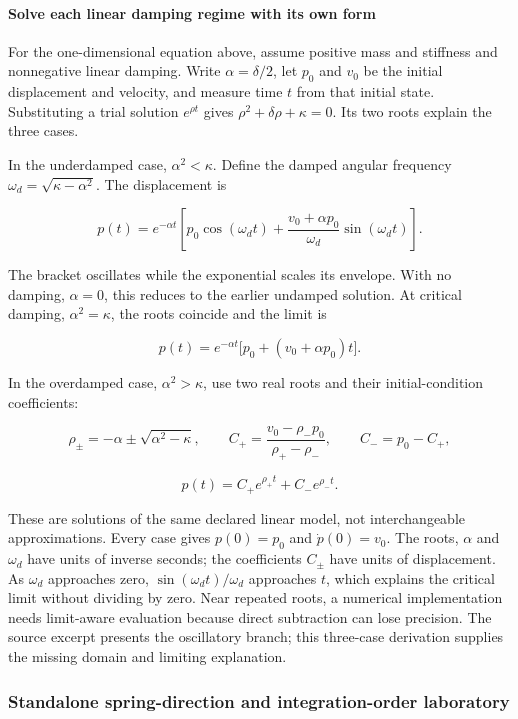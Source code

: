 \paragraph{Solve each linear damping regime with its own form}\label{solve-each-linear-damping-regime-with-its-own-form}

For the one-dimensional equation above, assume positive mass and stiffness and nonnegative linear damping. Write \(\alpha=\delta/2\), let \(p_0\) and \(v_0\) be the initial displacement and velocity, and measure time \(t\) from that initial state. Substituting a trial solution \(e^{\rho t}\) gives \(\rho^2+\delta\rho+\kappa=0\). Its two roots explain the three cases.

In the underdamped case, \(\alpha^2<\kappa\). Define the damped angular frequency \(\omega_d=\sqrt{\kappa-\alpha^2}\). The displacement is

\[
p(t)=e^{-\alpha t}\left[p_0\cos(\omega_d t)
+\frac{v_0+\alpha p_0}{\omega_d}\sin(\omega_d t)\right].
\]

The bracket oscillates while the exponential scales its envelope. With no damping, \(\alpha=0\), this reduces to the earlier undamped solution. At critical damping, \(\alpha^2=\kappa\), the roots coincide and the limit is

\[
p(t)=e^{-\alpha t}\bigl[p_0+(v_0+\alpha p_0)t\bigr].
\]

In the overdamped case, \(\alpha^2>\kappa\), use two real roots and their initial-condition coefficients:

\[
\rho_\pm=-\alpha\pm\sqrt{\alpha^2-\kappa},\qquad
C_+=\frac{v_0-\rho_-p_0}{\rho_+-\rho_-},\qquad C_-=p_0-C_+,
\]

\[
p(t)=C_+e^{\rho_+t}+C_-e^{\rho_-t}.
\]

These are solutions of the same declared linear model, not interchangeable approximations. Every case gives \(p(0)=p_0\) and \(\dot p(0)=v_0\). The roots, \(\alpha\) and \(\omega_d\) have units of inverse seconds; the coefficients \(C_\pm\) have units of displacement. As \(\omega_d\) approaches zero, \(\sin(\omega_d t)/\omega_d\) approaches \(t\), which explains the critical limit without dividing by zero. Near repeated roots, a numerical implementation needs limit-aware evaluation because direct subtraction can lose precision. The source excerpt presents the oscillatory branch; this three-case derivation supplies the missing domain and limiting explanation.

\subsubsection{Standalone spring-direction and integration-order laboratory}\label{standalone-spring-direction-and-integration-order-laboratory}

